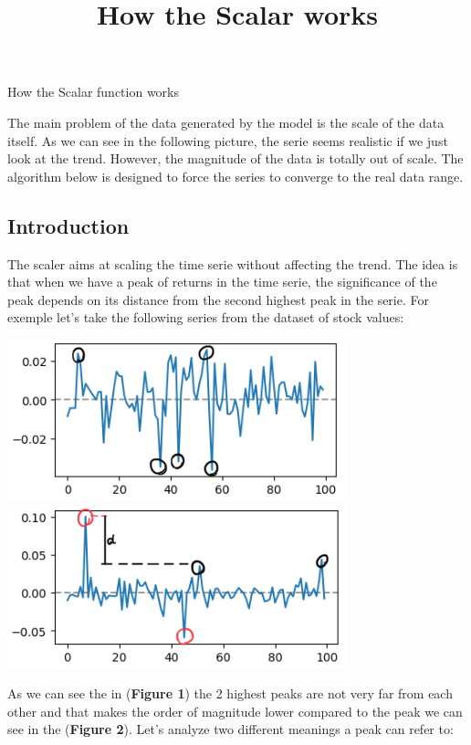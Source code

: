 \documentclass{article}
\title{How the Scalar works}
\begin{document}
\begin{center}
    {\huge{How the Scalar function works}}
\end{center}    
    \begin{multicols}{2}
    The main problem of the data generated by the model is the scale of the data itself.
    As we can see in the following picture, the serie seems realistic if we just look at the trend.
    However, the magnitude of the data is totally out of scale. The algorithm below is designed to force
    the series to converge to the real data range.
    \subsection*{Introduction}
    The scaler aims at scaling the time serie without affecting the trend. The idea is that when we have 
    a peak of returns in the time serie, the significance of the peak depends on its distance from the second highest peak in the serie. For exemple let's take the following series from the dataset of stock values:\\
    \begin{center}
        \includegraphics[scale = 0.7]{imgs/small_peaks.png}
        \includegraphics[scale = 0.7]{imgs/big_peaks.png}\\
    \end{center}
    As we can see the in (\textbf{Figure 1}) the 2 highest peaks are not very far from each other and that makes the order of magnitude lower compared to the peak we can see in the (\textbf{Figure 2}). Let's analyze two different meanings a peak can refer to:

\end{multicols}
\end{document}
